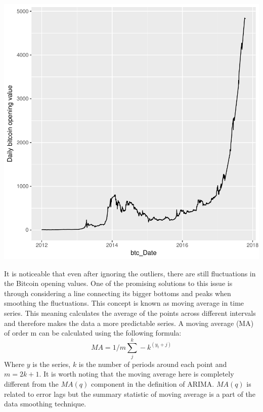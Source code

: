 \documentclass{article}
\begin{document}
\begin{Schunk}
\end{Schunk}
\includegraphics{Report-013}

It is noticeable that even after ignoring the outliers, there are still fluctuations in the Bitcoin opening values. One of the promising solutions to this issue is through considering a line connecting its bigger bottoms and peaks when smoothing the fluctuations. This concept is known as moving average in time series. This meaning calculates the average of the points across different intervals and therefore makes the data a more predictable series. 
A moving average (MA) of order m can be calculated using the following formula:
\[
MA=1/m \sum_{j}^{k}-k^(y_t+j) 
\]
Where $y$ is the series, $k$ is the number of periods around each point and $m=2k+1$.
It is worth noting that the moving average here is completely different from the $MA(q)$ component in the definition of ARIMA. $MA(q)$ is related to error lags but the summary statistic of moving average is a part of the data smoothing technique.
\end{document}
